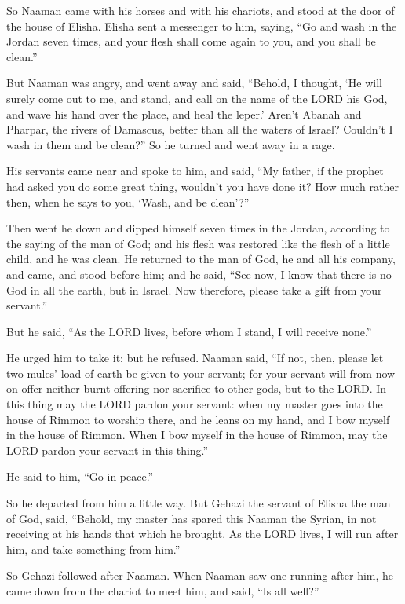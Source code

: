 \myverse{}So Naaman came with his horses and with his chariots, and stood
at the door of the house of Elisha.
\myverse{}Elisha sent a messenger to him, saying, “Go and wash in the Jordan seven times,
and your flesh shall come again to you, and you shall be clean.”

\myverse{}But Naaman was angry, and went away and said, “Behold, I thought,
‘He will surely come out to me, and stand, and call on the name of the LORD his God, and wave his hand
over the place, and heal the leper.’
\myverse{}Aren’t Abanah and Pharpar, the rivers of Damascus, better than all the waters
of Israel? Couldn’t I wash in them and be clean?” So he turned and went away in a rage.

\myverse{}His servants came near and spoke to him, and said, “My father,
if the prophet had asked you do some great thing, wouldn’t you have done it? How much rather then, when
he says to you, ‘Wash, and be clean’?”

\myverse{}Then went he down and dipped himself seven times in the Jordan,
according to the saying of the man of God; and his flesh was restored like the flesh of a little child,
and he was clean.
\myverse{}He returned to the man of God, he and all his company, and came, and stood
before him; and he said, “See now, I know that there is no God in all the earth, but in Israel. Now therefore,
please take a gift from your servant.”

\myverse{}But he said, “As the LORD lives, before whom I stand, I will
receive none.”

He urged him to take it; but he refused.
\myverse{}Naaman said, “If not, then, please let two mules’ load of earth be given to
your servant; for your servant will from now on offer neither burnt offering nor sacrifice to other gods,
but to the LORD.
\myverse{}In this thing may the LORD pardon your servant: when my master goes into the
house of Rimmon to worship there, and he leans on my hand, and I bow myself in the house of Rimmon. When
I bow myself in the house of Rimmon, may the LORD pardon your servant in this thing.”

\myverse{}He said to him, “Go in peace.”

So he departed from him a little way.
\myverse{}But Gehazi the servant of Elisha the man of God, said, “Behold, my master
has spared this Naaman the Syrian, in not receiving at his hands that which he brought. As the LORD lives,
I will run after him, and take something from him.”

\myverse{}So Gehazi followed after Naaman. When Naaman saw one running
after him, he came down from the chariot to meet him, and said, “Is all well?”

